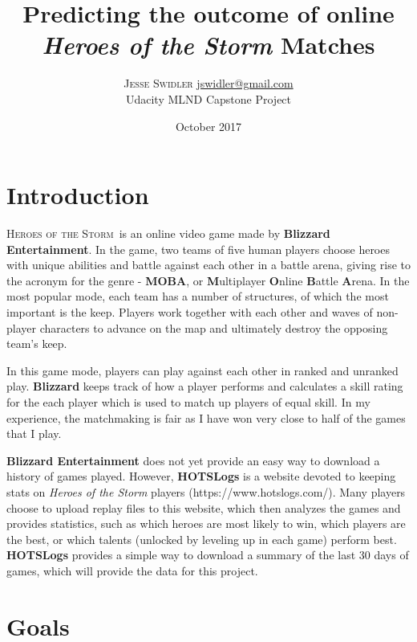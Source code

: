 \documentclass[twoside,twocolumn]{article}
\title{Predicting the outcome of online \textit{Heroes of the Storm} Matches} %
\author{%
\textsc{Jesse Swidler} %
\normalsize \href{mailto:jswidler@gmail.com}{jswidler@gmail.com} \\ %
\normalsize Udacity MLND Capstone Project %
}
\date{October 2017} %
\begin{document}
\maketitle


\section{Introduction}

\lettrine[nindent=0em,lines=2]{H}{eroes of the Storm}\normalfont\ is an online video game made by \textbf{Blizzard Entertainment}.  In the game, two teams of five human players choose heroes with unique abilities and battle against each other in a battle arena, giving rise to the acronym for the genre - \textbf{MOBA}, or \textbf{M}ultiplayer \textbf{O}nline \textbf{B}attle \textbf{A}rena.  In the most popular mode, each team has a number of structures, of which the most important is the keep.  Players work together with each other and waves of non-player characters to advance on the map and ultimately destroy the opposing team's keep.

In this game mode, players can play against each other in ranked and unranked play.  \textbf{Blizzard} keeps track of how a player performs and calculates a skill rating for the each player which is used to match up players of equal skill.  In my experience, the matchmaking is fair as I have won very close to half of the games that I play.

\textbf{Blizzard Entertainment} does not yet provide an easy way to download a history of games played.  However, \textbf{HOTSLogs} is a website devoted to keeping stats on \textit{Heroes of the Storm} players (https://www.hotslogs.com/).  Many players choose to upload replay files to this website, which then analyzes the games and provides statistics, such as which heroes are most likely to win, which players are the best, or which talents (unlocked by leveling up in each game) perform best.  \textbf{HOTSLogs} provides a simple way to download a summary of the last 30 days of games, which will provide the data for this project.

\section{Goals}
\end{document}
